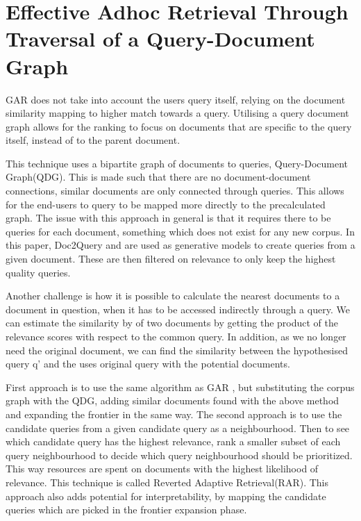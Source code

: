 \documentclass[sigconf,authorversion,nonacm]{acmart}
\begin{document}
\section{Effective Adhoc Retrieval Through Traversal of a Query-Document Graph}

GAR does not take into account the users query itself, relying on the document similarity mapping to
higher match towards a query. Utilising a query document graph allows for the ranking to focus on
documents that are specific to the query itself, instead of to the parent document.

This technique uses a bipartite graph of documents to queries, Query-Document Graph(QDG). This is
made such that there are no document-document connections, similar documents are only connected
through queries. This allows for the end-users to query to be mapped more directly to the
precalculated graph. The issue with this approach in general is that it requires there to be queries
for each document, something which does not exist for any new corpus. In this paper, Doc2Query and
are used as generative models to create queries from a given document. These are then
filtered on relevance to only keep the highest quality queries.

Another challenge is how it is possible to calculate the nearest documents to a document in
question, when it has to be accessed indirectly through a query. We can estimate the similarity by
of two documents by getting the product of the relevance scores with respect to the common query. In
addition, as we no longer need the original document, we can find the similarity between the
hypothesised query q' and the uses original query with the potential documents.

First approach is to use the same algorithm as GAR%
, but substituting the corpus graph with the QDG, adding similar documents found with the above
method and expanding the frontier in the same way. The second approach is to use the candidate
queries from a given candidate query as a neighbourhood. Then to see which candidate query has the
highest relevance, rank a smaller subset of each query neighbourhood to decide which query
neighbourhood should be prioritized. This way resources are spent on documents with the highest
likelihood of relevance. This technique is called Reverted Adaptive Retrieval(RAR). This approach
also adds potential for interpretability, by mapping the candidate queries which are picked in the
frontier expansion phase.
\end{document}
